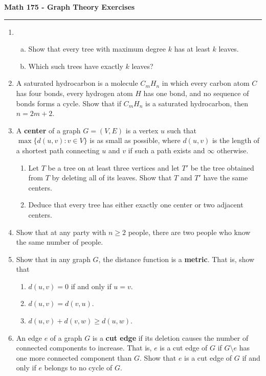 \documentclass[11pt,letterpaper]{report}
\begin{document}
\begin{center}
{\bf \Large Math 175 - Graph Theory Exercises}
\vspace{0.2cm}
\hrule
\end{center}

\begin{enumerate}
	\item \begin{enumerate}[(a)]
		\item Show that every tree with maximum degree $k$ has at least $k$ leaves.
		\item Which such trees have exactly $k$ leaves?
	\end{enumerate}

	\vfill

	\item A saturated hydrocarbon is a molecule $C_mH_n$ in which every carbon atom $C$ has four bonds, every hydrogen atom $H$ has one bond, and no sequence of bonds forms a cycle. Show that if $C_mH_n$ is a saturated hydrocarbon, then $n = 2m+2$.
	\vfill

	\item A \textbf{center} of a graph $G = (V, E)$ is a vertex $u$ such that $\max\{d(u, v): v\in V\}$ is as small as possible, where $d(u, v)$ is the length of a shortest path connecting $u$ and $v$ if such a path exists and $\infty$ otherwise.
	\begin{enumerate}
		\item Let $T$ be a tree on at least three vertices and let $T'$ be the tree obtained from $T$ by deleting all of its leaves. Show that $T$ and $T'$ have the same centers.
		\item Deduce that every tree has either exactly one center or two adjacent centers.
	\end{enumerate}

	\vfill

	\item Show that at any party with $n\geq 2$ people, there are two people who know the same number of people.

	\vfill

	\item Show that in any graph $G$, the distance function is a \textbf{metric}. That is, show that
	\begin{enumerate}
		\item $d(u,v) = 0$ if and only if $u=v$.
		\item $d(u,v) = d(v,u)$.
		\item $d(u,v)+d(v,w)\geq d(u, w)$.
	\end{enumerate}

	\vfill

	\item An edge $e$ of a graph $G$ is a \textbf{cut edge} if its deletion causes the number of connected components to increase. That is, $e$ is a cut edge of $G$ if $G\setminus e$ has one more connected component than $G$. Show that $e$ is a cut edge of $G$ if and only if $e$ belongs to no cycle of $G$.
	\vfill

\end{enumerate}
\end{document}
